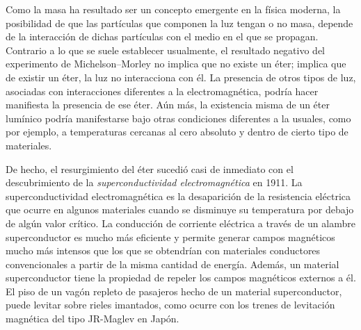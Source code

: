 Como la masa ha resultado ser un concepto emergente en la física moderna, la posibilidad de que las partículas que componen la luz tengan o no masa, depende de la interacción de dichas partículas con el medio en el que se propagan. Contrario a lo que se suele establecer usualmente, el resultado negativo del experimento de Michelson--Morley no implica que no existe un éter; implica que de existir un éter, la luz no interacciona con él. La presencia de otros tipos de luz, asociadas con interacciones diferentes a la electromagnética, podría hacer manifiesta la presencia de ese éter.  Aún más, la existencia misma de un éter lumínico podría manifestarse bajo otras condiciones diferentes a la usuales, como por ejemplo, a temperaturas cercanas al cero absoluto y dentro de cierto tipo de materiales.

De hecho, el resurgimiento del éter sucedió casi de inmediato con el descubrimiento de la \emph{superconductividad electromagnética} en 1911. La superconductividad electromagnética es la desaparición de la resistencia eléctrica que ocurre en algunos materiales cuando se disminuye su temperatura por debajo de algún valor crítico. La conducción de corriente eléctrica a través de un alambre superconductor es mucho más eficiente y permite generar campos magnéticos mucho más intensos que los que se obtendrían con materiales conductores convencionales a partir de  la misma cantidad de energía. Además, un material superconductor tiene la propiedad de repeler los campos magnéticos externos a él. El piso de un vagón repleto de pasajeros hecho de un material superconductor, puede levitar sobre rieles imantados, como ocurre con los trenes de levitación magnética del tipo JR-Maglev en Japón.

